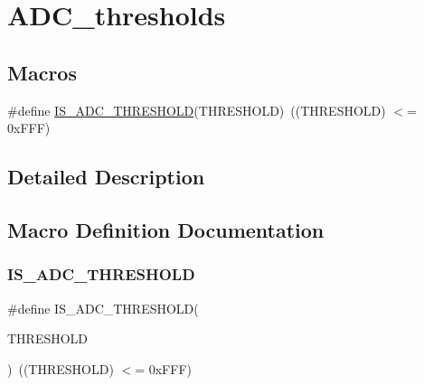 \hypertarget{group___a_d_c__thresholds}{}\section{A\+D\+C\+\_\+thresholds}
\label{group___a_d_c__thresholds}
\subsection*{Macros}
\begin{DoxyCompactItemize}
\item 
\#define \mbox{\hyperlink{group___a_d_c__thresholds_gaa71cdff6dafddfccff8a7e88768bfb54}{I\+S\+\_\+\+A\+D\+C\+\_\+\+T\+H\+R\+E\+S\+H\+O\+LD}}(T\+H\+R\+E\+S\+H\+O\+LD)~((T\+H\+R\+E\+S\+H\+O\+LD) $<$= 0x\+F\+F\+F)
\end{DoxyCompactItemize}


\subsection{Detailed Description}


\subsection{Macro Definition Documentation}
\mbox{\label{group___a_d_c__thresholds_gaa71cdff6dafddfccff8a7e88768bfb54}} 
\subsubsection{\texorpdfstring{IS\_ADC\_THRESHOLD}{IS\_ADC\_THRESHOLD}}
{\footnotesize\ttfamily \#define I\+S\+\_\+\+A\+D\+C\+\_\+\+T\+H\+R\+E\+S\+H\+O\+LD(\begin{DoxyParamCaption}\item[{}]{T\+H\+R\+E\+S\+H\+O\+LD }\end{DoxyParamCaption})~((T\+H\+R\+E\+S\+H\+O\+LD) $<$= 0x\+F\+F\+F)}

